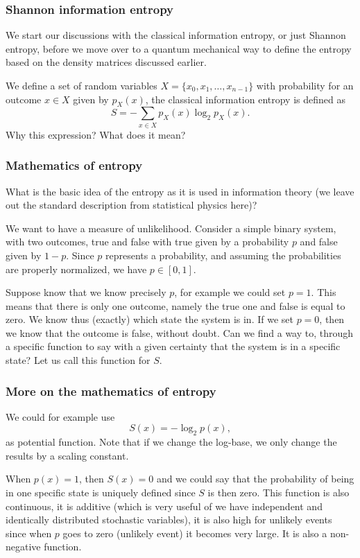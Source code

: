 \documentclass{beamer}
\begin{document}
\begin{frame}
\frametitle{Shannon information entropy}

We start our discussions with the classical information entropy, or
just Shannon entropy, before we move over to a quantum mechanical way
to define the entropy based on the density matrices discussed earlier.

We define a set of random variables $X=\{x_0,x_1,\dots,x_{n-1}\}$ with probability for an outcome $x\in X$ given by $p_X(x)$, the
classical information entropy is defined as
\[
S=-\sum_{x\in X}p_X(x)\log_2{p_X(x)}.
\]
Why this expression? What does it mean?
\end{frame}

\begin{frame}
\frametitle{Mathematics of entropy}

What is the basic idea of the entropy as it is used in information
theory (we leave out the standard description from statistical physics
here)?

We want to have a measure of unlikelihood. Consider a simple binary
system, with two outcomes, true and false with true given by a
probability $p$ and false given by $1-p$. Since $p$ represents a
probability, and assuming the probabilities are properly normalized,
we have $p\in [0,1]$.

Suppose know that we know precisely $p$, for example we could set
$p=1$. This means that there is only one outcome, namely the true one
and false is equal to zero. We know thus (exactly) which state the
system is in.  If we set $p=0$, then we know that the outcome is
false, without doubt.  Can we find a way to, through a specific
function to say with a given certainty that the system is in a
specific state? Let us call this function for $S$.
\end{frame}

\begin{frame}
\frametitle{More on the mathematics of entropy}

We could for example use
\[
S(x)= -\log_2{p(x)},
\]
as potential
function. Note that if we change the log-base, we only change the results by a scaling constant.

When $p(x)=1$, then $S(x)=0$ and we could say that the
probability of being in one specific state is uniquely defined since
$S$ is then zero.  This function is also continuous, it is additive
(which is very useful of we have independent and identically
distributed stochastic variables), it is also high for unlikely events
since when $p$ goes to zero (unlikely event) it becomes very
large. It is also a non-negative function.
\end{frame}
\end{document}
